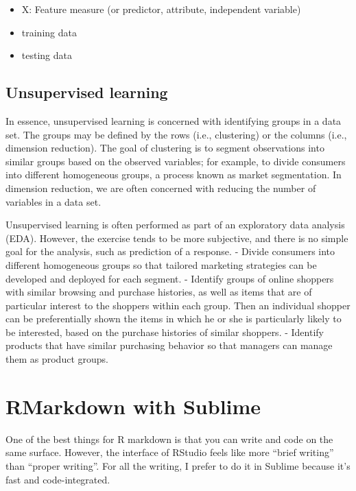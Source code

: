 \documentclass[]{book}
\providecommand{\tightlist}{%
  \setlength{\itemsep}{0pt}\setlength{\parskip}{0pt}}
\begin{document}
\begin{itemize}
\tightlist
\item
  X: Feature measure (or predictor, attribute, independent variable)
\item
  training data
\item
  testing data
\end{itemize}

\hypertarget{unsupervised-learning}{%
\section{Unsupervised learning}\label{unsupervised-learning}}

In essence, unsupervised learning is concerned with identifying groups in a data set. The groups may be defined by the rows (i.e., clustering) or the columns (i.e., dimension reduction). The goal of clustering is to segment observations into similar groups based on the observed variables; for example, to divide consumers into different homogeneous groups, a process known as market segmentation. In dimension reduction, we are often concerned with reducing the number of variables in a data set.

Unsupervised learning is often performed as part of an exploratory data analysis (EDA). However, the exercise tends to be more subjective, and there is no simple goal for the analysis, such as prediction of a response.
- Divide consumers into different homogeneous groups so that tailored marketing strategies can be developed and deployed for each segment.
- Identify groups of online shoppers with similar browsing and purchase histories, as well as items that are of particular interest to the shoppers within each group. Then an individual shopper can be preferentially shown the items in which he or she is particularly likely to be interested, based on the purchase histories of similar shoppers.
- Identify products that have similar purchasing behavior so that managers can manage them as product groups.

\hypertarget{rmarkdown-with-sublime}{%
\chapter{RMarkdown with Sublime}\label{rmarkdown-with-sublime}}

One of the best things for R markdown is that you can write and code on the same surface. However, the interface of RStudio feels like more ``brief writing'' than ``proper writing''. For all the writing, I prefer to do it in Sublime because it's fast and code-integrated.
\end{document}
